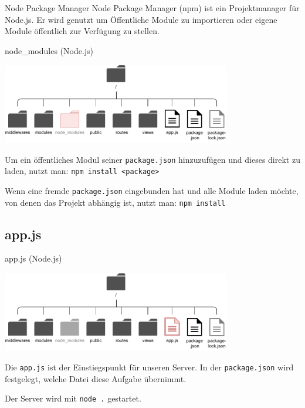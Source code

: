\begin{defi}{Node Package Manager}
    Node Package Manager (npm) ist ein Projektmanager für Node.js.
    Er wird genutzt um Öffentliche Module zu importieren oder eigene Module öffentlich zur Verfügung zu stellen.
\end{defi}

\begin{bonus}{node\_modules (Node.js)}
    \begin{center}
        \includegraphics[width=0.75\textwidth]{includes/figures/bonus_nodejs_node_modules.pdf}
    \end{center}

    Um ein öffentliches Modul seiner \texttt{package.json} hinzuzufügen und dieses direkt zu laden, nutzt man:
    \texttt{npm install <package>}

    Wenn eine fremde \texttt{package.json} eingebunden hat und alle Module laden möchte, von denen das Projekt abhängig ist, nutzt man:
    \texttt{npm install}
\end{bonus}

\subsection{app.js}

\begin{bonus}{app.js (Node.js)}
    \begin{center}
        \includegraphics[width=0.75\textwidth]{includes/figures/bonus_nodejs_app.pdf}
    \end{center}

    Die \texttt{app.js} ist der Einstiegspunkt für unseren Server.
    In der \texttt{package.json} wird festgelegt, welche Datei diese Aufgabe übernimmt.

    Der Server wird mit \texttt{node .} gestartet.
\end{bonus}

